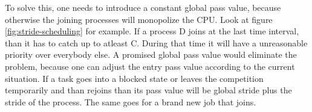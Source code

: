 To solve this, one needs to introduce a constant global pass value, because otherwise the joining processes will monopolize the CPU. 
Look at figure \ref{fig:stride-scheduling} for example.
If a process D joins at the last time interval, than it has to catch up to atleast C. During that time it will have a unreasonable priority over everybody else.
A promised global pass value would eliminate the problem, because one can adjust the entry pass value according to the current situation.
If a task goes into a blocked state or leaves the competition temporarily and than rejoins than its pass value will be global stride plus the stride of the process. The same goes for a brand new job that joins.
